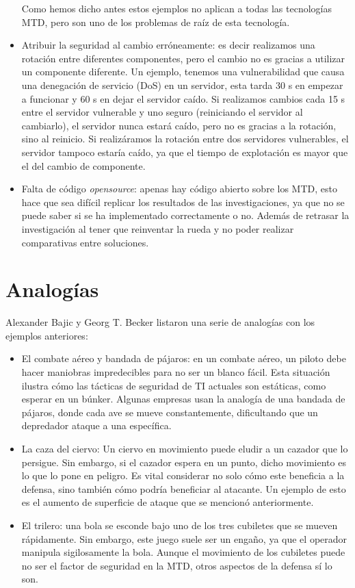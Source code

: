 \begin{itemize}
\begin{enumerate}
    \end{enumerate}
    Como hemos dicho antes estos ejemplos no aplican a todas las tecnologías MTD, pero son uno de los problemas de raíz de esta tecnología.
    \item Atribuir la seguridad al cambio erróneamente: es decir realizamos una rotación entre diferentes componentes, pero el cambio no es gracias a utilizar un componente diferente. Un ejemplo, tenemos una vulnerabilidad que causa una denegación de servicio (DoS) en un servidor, esta tarda 30 s en empezar a funcionar y 60 s en dejar el servidor caído. Si realizamos cambios cada 15 s entre el servidor vulnerable y uno seguro (reiniciando el servidor al cambiarlo), el servidor nunca estará caído, pero no es gracias a la rotación, sino al reinicio. Si realizáramos la rotación entre dos servidores vulnerables, el servidor tampoco estaría caído, ya que el tiempo de explotación es mayor que el del cambio de componente.
    \item Falta de código \textit{opensource}: apenas hay código abierto sobre los MTD, esto hace que sea difícil replicar los resultados de las investigaciones, ya que no se puede saber si se ha implementado correctamente o no. Además de retrasar la investigación al tener que reinventar la rueda y no poder realizar comparativas entre soluciones.
\end{itemize}

\section{Analogías}

Alexander Bajic y Georg T. Becker listaron una serie de analogías\cite{MTD-critica} con los ejemplos anteriores:
\begin{itemize}
    \item El combate aéreo y bandada de pájaros: en un combate aéreo, un piloto debe hacer maniobras impredecibles para no ser un blanco fácil. Esta situación ilustra cómo las tácticas de seguridad de TI actuales son estáticas, como esperar en un búnker. Algunas empresas usan la analogía de una bandada de pájaros, donde cada ave se mueve constantemente, dificultando que un depredador ataque a una específica.
    \item La caza del ciervo: Un ciervo en movimiento puede eludir a un cazador que lo persigue. Sin embargo, si el cazador espera en un punto, dicho movimiento es lo que lo pone en peligro. Es vital considerar no solo cómo este beneficia a la defensa, sino también cómo podría beneficiar al atacante. Un ejemplo de esto es el aumento de superficie de ataque que se mencionó anteriormente.
    \item El trilero: una bola se esconde bajo uno de los tres cubiletes que se mueven rápidamente. Sin embargo, este juego suele ser un engaño, ya que el operador manipula sigilosamente la bola. Aunque el movimiento de los cubiletes puede no ser el factor de seguridad en la MTD, otros aspectos de la defensa sí lo son.
\end{itemize}

